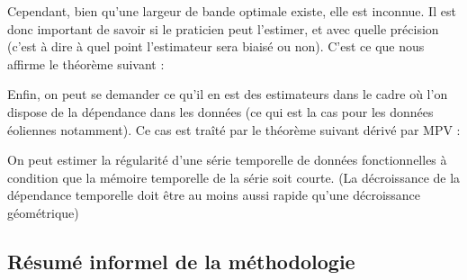 Cependant, bien qu'une largeur de bande optimale existe, elle est inconnue. Il est donc important de savoir si le praticien peut l'estimer, et avec quelle précision (c'est à dire à quel point l'estimateur sera biaisé ou non). C'est ce que nous affirme le théorème suivant :

\pagebreak

\begin{thm*}
    \noindent{}
        
    \label{thm*:h_opt_estim}
\end{thm*}


Enfin, on peut se demander ce qu'il en est des estimateurs dans le cadre où l'on dispose de la dépendance dans les données (ce qui est la cas pour les données éoliennes notamment). Ce cas est traîté par le théorème suivant dérivé par MPV :

\begin{thm*}

    On peut estimer la régularité d'une série temporelle de données fonctionnelles à condition que la mémoire temporelle de la série soit courte. (La décroissance de la dépendance temporelle doit être au moins aussi rapide qu'une décroissance géométrique)

    \label{thm*:far_adaptative_estimation}
\end{thm*}

\pagebreak

\subsection{Résumé informel de la méthodologie}


